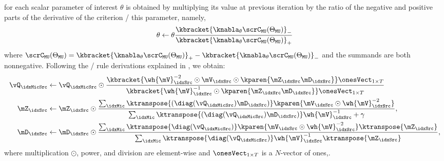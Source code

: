  for each scalar parameter of interest $\theta$ is obtained by multiplying its value at previous iteration by the ratio of the negative and positive parts of the derivative of the criterion \wrt/ this parameter, namely,
\begin{equation*}
    \theta \gets \theta \frac{\kbracket{\knabla_\theta \scrC_{\mathtt{MU}}(\Theta_{\mathtt{MU}})}_{-}}
                             {\kbracket{\knabla_\theta \scrC_{\mathtt{MU}}(\Theta_{\mathtt{MU}})}_{+}}
\end{equation*}
where $\scrC_{\mathtt{MU}}(\Theta_{\mathtt{MU}}) = {\kbracket{\knabla_\theta \scrC_{\mathtt{MU}}(\Theta_{\mathtt{MU}})}_{+}} - {\kbracket{\knabla_\theta \scrC_{\mathtt{MU}}(\Theta_{\mathtt{MU}})}_{-}}$ and the summands are both nonnegative.
Following the \MU/ rule derivations explained in \citeauthor{ozerov2010multichannel}, we obtain:
\begin{align}
    \vQ_{\idxMicSrc} &\gets\vQ_{\idxMicSrc} \odot \frac{\kbracket{\wh{\mV}_\idxSrc^{-2} \odot \mV_\idxSrc \odot \kparen{\mZ_\idxSrc \mD_\idxSrc}}\onesVect_{1\times T}}{
                                            \kbracket{\wh{\mV}_\idxSrc^{-1} \odot \kparen{\mZ_\idxSrc \mD_\idxSrc}}\onesVect_{1\times T}}\\
    \mZ_\idxSrc &\gets \mZ_\idxSrc \odot \frac{\sum_\idxMic \ktranspose{(\diag(\vQ_{\idxMicSrc}) \mD_\idxSrc)} \kparen{\mV_\idxSrc \odot \wh{\mV}_\idxSrc^{-2}}}{
                                            \sum_\idxMic \ktranspose{(\diag(\vQ_{\idxMicSrc}) \mD_\idxSrc)} \wh{\mV}_\idxSrc^{-1} + \gamma},\\
    \mD_\idxSrc &\gets \mD_\idxSrc \odot \frac{\sum_\idxMic \ktranspose{ \diag(\vQ_{\idxMicSrc})} \kparen{\mV_\idxSrc \odot \wh{\mV}_\idxSrc^{-2}}\ktranspose{\mZ_\idxSrc}}{
                                            \sum_\idxMic \ktranspose{ \diag(\vQ_{\idxMicSrc})} \wh{\mV}_\idxSrc^{-1} \ktranspose{\mZ_\idxSrc}},
\end{align}
where multiplication $\odot$, power, and division are element-wise and $\onesVect_{1\times T}$ is a $N$-vector of ones,.

